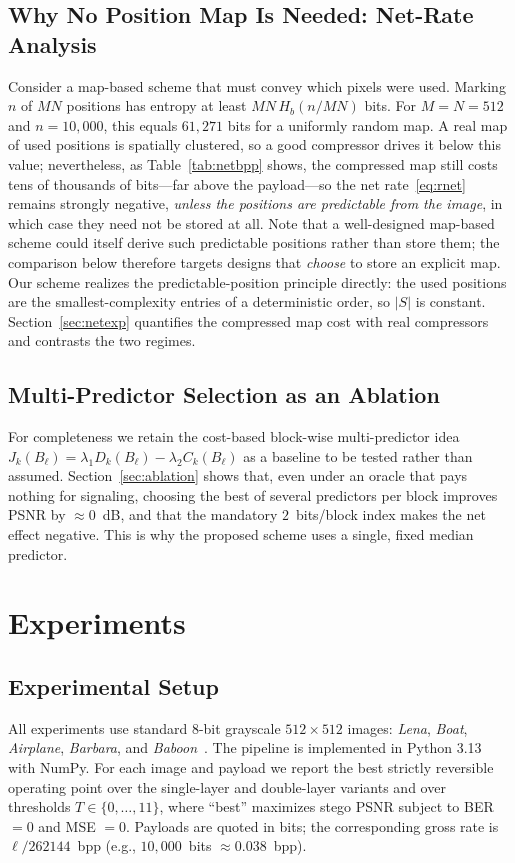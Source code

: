 \documentclass[journal,article,submit,pdftex,moreauthors]{Definitions/mdpi}
\begin{document}
\subsection{Why No Position Map Is Needed: Net-Rate Analysis}\label{sec:netbpp}
Consider a map-based scheme that must convey which pixels were used. Marking $n$ of $MN$ positions has entropy at least $MN\,H_b(n/MN)$ bits. For $M=N=512$ and $n=10{,}000$, this equals $61{,}271$ bits for a uniformly random map. A real map of used positions is spatially clustered, so a good compressor drives it below this value; nevertheless, as Table~\ref{tab:netbpp} shows, the compressed map still costs tens of thousands of bits---far above the payload---so the net rate~\eqref{eq:rnet} remains strongly negative, \emph{unless the positions are predictable from the image}, in which case they need not be stored at all. Note that a well-designed map-based scheme could itself derive such predictable positions rather than store them; the comparison below therefore targets designs that \emph{choose} to store an explicit map. Our scheme realizes the predictable-position principle directly: the used positions are the smallest-complexity entries of a deterministic order, so $|S|$ is constant. Section~\ref{sec:netexp} quantifies the compressed map cost with real compressors and contrasts the two regimes.

\subsection{Multi-Predictor Selection as an Ablation}\label{sec:multipred}
For completeness we retain the cost-based block-wise multi-predictor idea $J_k(B_\ell)=\lambda_1 D_k(B_\ell)-\lambda_2 C_k(B_\ell)$ as a baseline to be tested rather than assumed. Section~\ref{sec:ablation} shows that, even under an oracle that pays nothing for signaling, choosing the best of several predictors per block improves PSNR by $\approx0$~dB, and that the mandatory $2$~bits/block index makes the net effect negative. This is why the proposed scheme uses a single, fixed median predictor.

\section{Experiments}\label{sec:experiments}
\subsection{Experimental Setup}
All experiments use standard $8$-bit grayscale $512\times512$ images: \emph{Lena}, \emph{Boat}, \emph{Airplane}, \emph{Barbara}, and \emph{Baboon}~\cite{USCSIPI}. The pipeline is implemented in Python 3.13 with NumPy. For each image and payload we report the best strictly reversible operating point over the single-layer and double-layer variants and over thresholds $T\in\{0,\ldots,11\}$, where ``best'' maximizes stego PSNR subject to BER $=0$ and MSE $=0$. Payloads are quoted in bits; the corresponding gross rate is $\ell/262144$~bpp (e.g., $10{,}000$~bits $\approx0.038$~bpp).
\end{document}
